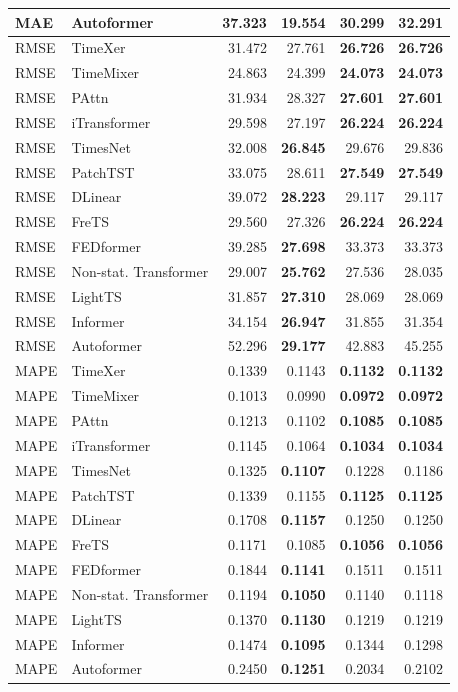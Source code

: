 \begin{longtable}{llrrrr}
MAE & Autoformer & 37.323 & \textbf{19.554} & 30.299 & 32.291 \\
\midrule
RMSE & TimeXer & 31.472 & 27.761 & \textbf{26.726} & \textbf{26.726} \\
RMSE & TimeMixer & 24.863 & 24.399 & \textbf{24.073} & \textbf{24.073} \\
RMSE & PAttn & 31.934 & 28.327 & \textbf{27.601} & \textbf{27.601} \\
RMSE & iTransformer & 29.598 & 27.197 & \textbf{26.224} & \textbf{26.224} \\
RMSE & TimesNet & 32.008 & \textbf{26.845} & 29.676 & 29.836 \\
RMSE & PatchTST & 33.075 & 28.611 & \textbf{27.549} & \textbf{27.549} \\
RMSE & DLinear & 39.072 & \textbf{28.223} & 29.117 & 29.117 \\
RMSE & FreTS & 29.560 & 27.326 & \textbf{26.224} & \textbf{26.224} \\
RMSE & FEDformer & 39.285 & \textbf{27.698} & 33.373 & 33.373 \\
RMSE & Non-stat. Transformer & 29.007 & \textbf{25.762} & 27.536 & 28.035 \\
RMSE & LightTS & 31.857 & \textbf{27.310} & 28.069 & 28.069 \\
RMSE & Informer & 34.154 & \textbf{26.947} & 31.855 & 31.354 \\
RMSE & Autoformer & 52.296 & \textbf{29.177} & 42.883 & 45.255 \\
\midrule
MAPE & TimeXer & 0.1339 & 0.1143 & \textbf{0.1132} & \textbf{0.1132} \\
MAPE & TimeMixer & 0.1013 & 0.0990 & \textbf{0.0972} & \textbf{0.0972} \\
MAPE & PAttn & 0.1213 & 0.1102 & \textbf{0.1085} & \textbf{0.1085} \\
MAPE & iTransformer & 0.1145 & 0.1064 & \textbf{0.1034} & \textbf{0.1034} \\
MAPE & TimesNet & 0.1325 & \textbf{0.1107} & 0.1228 & 0.1186 \\
MAPE & PatchTST & 0.1339 & 0.1155 & \textbf{0.1125} & \textbf{0.1125} \\
MAPE & DLinear & 0.1708 & \textbf{0.1157} & 0.1250 & 0.1250 \\
MAPE & FreTS & 0.1171 & 0.1085 & \textbf{0.1056} & \textbf{0.1056} \\
MAPE & FEDformer & 0.1844 & \textbf{0.1141} & 0.1511 & 0.1511 \\
MAPE & Non-stat. Transformer & 0.1194 & \textbf{0.1050} & 0.1140 & 0.1118 \\
MAPE & LightTS & 0.1370 & \textbf{0.1130} & 0.1219 & 0.1219 \\
MAPE & Informer & 0.1474 & \textbf{0.1095} & 0.1344 & 0.1298 \\
MAPE & Autoformer & 0.2450 & \textbf{0.1251} & 0.2034 & 0.2102 \\
\end{longtable}
\endgroup

